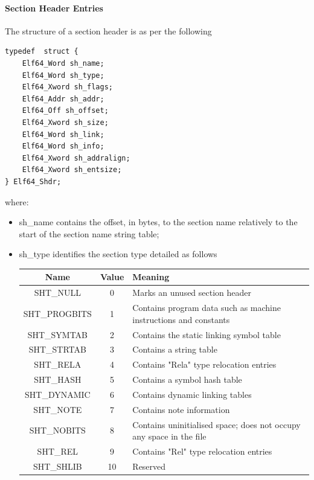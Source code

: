 \documentclass[paper=a4, fontsize=11pt]{report} %
\numberwithin{equation}{section} %
\numberwithin{figure}{section} %
\numberwithin{table}{section} %
\begin{document}
\paragraph{Section Header Entries}
The structure of a section header is as per the following
\begin{lstlisting}[style=ansic, caption={Section Header}, label=shdr]
typedef  struct {
	Elf64_Word sh_name;
	Elf64_Word sh_type;
	Elf64_Xword sh_flags;
	Elf64_Addr sh_addr;
	Elf64_Off sh_offset;
	Elf64_Xword sh_size;
	Elf64_Word sh_link;
	Elf64_Word sh_info;
	Elf64_Xword sh_addralign;
	Elf64_Xword sh_entsize;
} Elf64_Shdr;
\end{lstlisting}
where:
\begin{itemize}
	\item {\ttfamily sh\_name} contains the offset, in bytes, to the section 
	name relatively to the start of the section name string table;
	\item {\ttfamily sh\_type} identifies the section type detailed as follows
	\begin{center}
		\begin{tabular}{|c|c|p{6cm}|}
			\hline
			\textbf{Name} & \textbf{Value} & \textbf{Meaning} \\ \hline
			{\ttfamily SHT\_NULL} & 0 & Marks an unused section 
			header \\ \hline
			{\ttfamily SHT\_PROGBITS} & 1 & Contains program data such as 
			machine instructions and constants \\ \hline
			{\ttfamily SHT\_SYMTAB} & 2 & Contains the static linking symbol 
			table \\ \hline
			{\ttfamily SHT\_STRTAB} & 3 & Contains a string table \\ 
			\hline
			{\ttfamily SHT\_RELA} & 4 & Contains "Rela" type 
			relocation entries \\ \hline
			{\ttfamily SHT\_HASH} & 5 & Contains a symbol hash table \\ \hline
			{\ttfamily SHT\_DYNAMIC} & 6 & Contains dynamic linking tables\\ 
			\hline
			{\ttfamily SHT\_NOTE} & 7 & Contains note information\\ \hline
			{\ttfamily SHT\_NOBITS} & 8 & Contains uninitialised 
			space; does not occupy any space in the file\\ \hline
			{\ttfamily SHT\_REL} & 9 & Contains "Rel" type relocation entries\\ 
			\hline
			{\ttfamily SHT\_SHLIB} & 10 & Reserved\\ \hline

\end{tabular}
\end{center}
\end{itemize}
\end{document}
